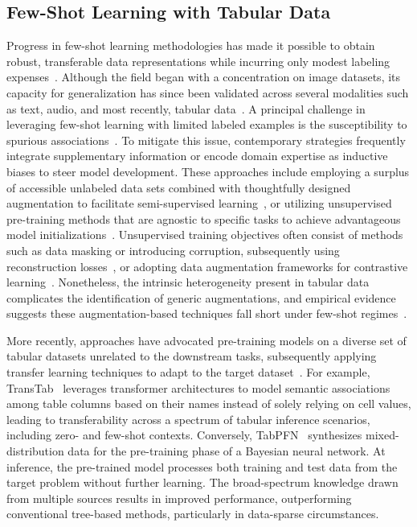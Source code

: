 \subsection{Few-Shot Learning with Tabular Data} 
Progress in few-shot learning methodologies has made it possible to obtain robust, transferable data representations while incurring only modest labeling expenses~\cite{chen2018closer}. Although the field began with a concentration on image datasets, its capacity for generalization has since been validated across several modalities such as text, audio, and most recently, tabular data~\cite{majumder2022few,nam2023stunt,schick2021exploiting}. A principal challenge in leveraging few-shot learning with limited labeled examples is the susceptibility to spurious associations~\cite{bartlett2021deep}. To mitigate this issue, contemporary strategies frequently integrate supplementary information or encode domain expertise as inductive biases to steer model development. These approaches include employing a surplus of accessible unlabeled data sets combined with thoughtfully designed augmentation to facilitate semi-supervised learning~\cite{ucar2021subtab,yoon2020vime}, or utilizing unsupervised pre-training methods that are agnostic to specific tasks to achieve advantageous model initializations~\cite{somepalli2021saint}. Unsupervised training objectives often consist of methods such as data masking or introducing corruption, subsequently using reconstruction losses~\cite{arik2021tabnet,majmundar2022met}, or adopting data augmentation frameworks for contrastive learning~\cite{bahri2022scarf,chen2020simple}. Nonetheless, the intrinsic heterogeneity present in tabular data complicates the identification of generic augmentations, and empirical evidence suggests these augmentation-based techniques fall short under few-shot regimes~\cite{nam2023stunt}.

More recently, approaches have advocated pre-training models on a diverse set of tabular datasets unrelated to the downstream tasks, subsequently applying transfer learning techniques to adapt to the target dataset~\cite{zhang2023generative,levin2022transfer,zhu2023xtab}. For example, TransTab~\cite{wang2022transtab} leverages transformer architectures to model semantic associations among table columns based on their names instead of solely relying on cell values, leading to transferability across a spectrum of tabular inference scenarios, including zero- and few-shot contexts. Conversely, TabPFN~\cite{hollmann2022tabpfn} synthesizes mixed-distribution data for the pre-training phase of a Bayesian neural network. At inference, the pre-trained model processes both training and test data from the target problem without further learning. The broad-spectrum knowledge drawn from multiple sources results in improved performance, outperforming conventional tree-based methods, particularly in data-sparse circumstances.

